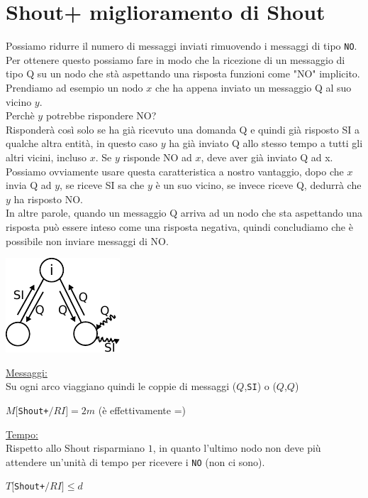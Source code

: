 \section{Shout+ miglioramento di Shout}
Possiamo ridurre il numero di messaggi inviati rimuovendo i messaggi di tipo \texttt{NO}. Per ottenere questo possiamo fare in modo che la ricezione di un messaggio di tipo Q su un nodo che stà aspettando una risposta funzioni come "NO" implicito.\\
Prendiamo ad esempio un nodo $x$ che ha appena inviato un messaggio Q al suo vicino $y$.\\ Perchè $y$ potrebbe rispondere NO? \\Risponderà così solo se ha già ricevuto una domanda Q e quindi già risposto SI a qualche altra entità, in questo caso $y$ ha già inviato Q allo stesso tempo a tutti gli altri vicini, incluso $x$. Se $y$ risponde NO ad $x$, deve aver già inviato Q ad x. Possiamo ovviamente usare questa caratteristica a nostro vantaggio, dopo che $x$ invia Q ad $y$, se riceve SI sa che $y$ è un suo vicino, se invece riceve Q, dedurrà che $y$ ha risposto NO.\\
In altre parole, quando un messaggio Q arriva ad un nodo che sta aspettando una risposta può essere inteso come una risposta negativa, quindi concludiamo che è possibile non inviare messaggi di NO.
\begin{center}
  \includegraphics[scale=1.4]{images/n_23}
\end{center}
\underline{Messaggi:}\\
Su ogni arco viaggiano quindi le coppie di messaggi ($Q$,\texttt{SI}) o ($Q$,$Q$)

\begin{center}
  $M[$\texttt{Shout+}$/RI] = 2m$ (è effettivamente =)\\
\end{center}

\underline{Tempo:}\\ 
 Rispetto allo Shout risparmiano $1$, in quanto l'ultimo nodo non deve più attendere un'unità di tempo per ricevere i \texttt{NO} (non ci sono).
\begin{center}
  $T[$\texttt{Shout+}$/RI] \leq d$
\end{center}

